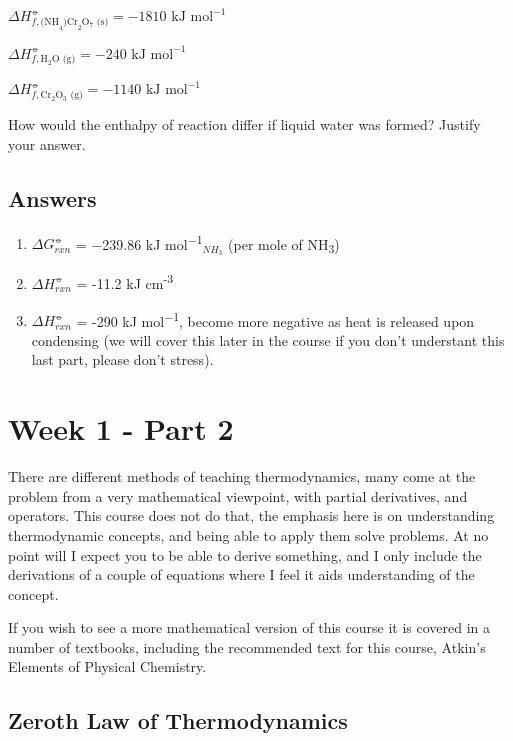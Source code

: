 \documentclass[
]{book}
\providecommand{\tightlist}{%
  \setlength{\itemsep}{0pt}\setlength{\parskip}{0pt}}
\begin{document}
\(ΔH^⦵_{f, \textrm{(NH}_4\textrm{)Cr}_2\textrm{O}_7\textrm{ (s)}} = −1810 \textrm{ kJ mol}^{−1}\)

\(ΔH^⦵_{f, \textrm{H}_2 \textrm{O (g)}} = −240 \textrm{ kJ mol}^{−1}\)

\(ΔH^⦵_{f, \textrm{Cr}_2 \textrm{O}_3 \textrm{ (g)}} = −1140 \textrm{ kJ mol}^{−1}\)

How would the enthalpy of reaction differ if liquid water was formed? Justify your answer.

\hypertarget{sec:Answers1}{%
\section{Answers}\label{sec:Answers1}}

\begin{enumerate}
\def\labelenumi{\arabic{enumi}.}
\tightlist
\item
  \(ΔG_{rxn}^⦵\) = −239.86 kJ mol\textsuperscript{−1}\(_{NH_3}\) (per mole of NH\textsubscript{3})
\item
  \(ΔH_{rxn}^⦵\) = -11.2 kJ cm\textsuperscript{-3}
\item
  \(ΔH_{rxn}^⦵\) = -290 kJ mol\textsuperscript{−1}, become more negative as heat is released upon condensing (we will cover this later in the course if you don't understant this last part, please don't stress).
\end{enumerate}

\hypertarget{ch:Part2}{%
\chapter{Week 1 - Part 2}\label{ch:Part2}}

There are different methods of teaching thermodynamics, many come at the problem from a very mathematical viewpoint, with partial derivatives, and operators. This course does not do that, the emphasis here is on understanding thermodynamic concepts, and being able to apply them solve problems. At no point will I expect you to be able to derive something, and I only include the derivations of a couple of equations where I feel it aids understanding of the concept.

If you wish to see a more mathematical version of this course it is covered in a number of textbooks, including the recommended text for this course, Atkin's Elements of Physical Chemistry.

\hypertarget{sec:zeroth}{%
\section{Zeroth Law of Thermodynamics}\label{sec:zeroth}}
\end{document}

